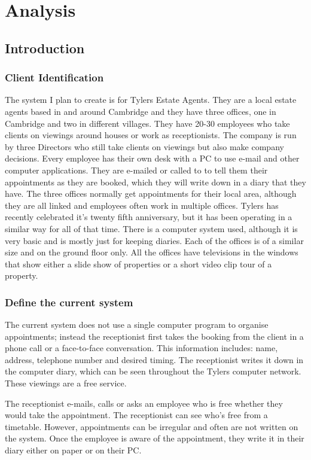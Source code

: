 \chapter{Analysis}
\section{Introduction}
\subsection{Client Identification}
The system I plan to create is for Tylers Estate Agents. They are a local estate agents based in and around Cambridge and they have three offices, one in Cambridge and two in different villages. They have 20-30 employees who take clients on viewings around houses or work as receptionists. The company is run by three Directors who still take clients on viewings but also make company decisions. Every employee has their own desk with a PC to use e-mail and other computer applications. They are e-mailed or called to to tell them their appointments as they are booked, which they will write down in a diary that they have. The three offices normally get appointments for their local area, although they are all linked and employees often work in multiple offices. Tylers has recently celebrated it's twenty fifth anniversary, but it has been operating in a similar way for all of that time. There is a computer system used, although it is very basic and is mostly just for keeping diaries. Each of the offices is of a similar size and on the ground floor only. All the offices have televisions in the windows that show either a slide show of properties or a short video clip tour of a property.
\subsection{Define the current system}
The current system does not use a single computer program to organise appointments; instead the receptionist first takes the booking from the client in a phone call or a face-to-face conversation. This information includes: name, address, telephone number and desired timing. The receptionist writes it down in the computer diary, which can be seen throughout the Tylers computer network. These viewings are a free service. 

The receptionist e-mails, calls or asks an employee who is free whether they would take the appointment. The receptionist can see who's free from a timetable. However, appointments can be irregular and often are not written on the system. Once the employee is aware of the appointment, they write it in their diary either on paper or on their PC.

